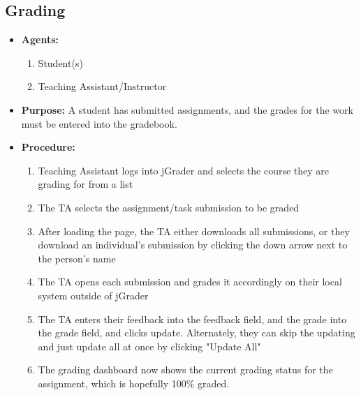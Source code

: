 \subsection{Grading}

\begin{itemize}
  \item \textbf{Agents:} \begin{enumerate}
    \item Student(s)
    \item Teaching Assistant/Instructor
  \end{enumerate}
  \item \textbf{Purpose:} A student has submitted assignments, and the grades for the work must be entered into the gradebook.
  \item \textbf{Procedure:}
  \begin{enumerate}
    \item Teaching Assistant logs into jGrader and selects the course they are grading for from a list
    \item The TA selects the assignment/task submission to be graded
    \item After loading the page, the TA either downloads all submissions, or they download an individual's submission by clicking the down arrow next to the person's name
    \item The TA opens each submission and grades it accordingly on their local system outside of jGrader
    \item The TA enters their feedback into the feedback field, and the grade into the grade field, and clicks update.
    	\subitem Alternately, they can skip the updating and just update all at once by clicking "Update All"
    \item The grading dashboard now shows the current grading status for the assignment, which is hopefully 100\% graded. 
  \end{enumerate}
\end{itemize}
